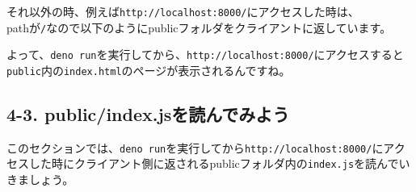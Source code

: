 \begin{Shaded}
\begin{Highlighting}[]
  \OperatorTok{=}  \NormalTok{)}\OperatorTok{;}
   \OperatorTok{===}  \OperatorTok{\&\&}\OperatorTok{===} \NormalTok{) \{}
      \NormalTok{(}\NormalTok{)}\OperatorTok{;}
\NormalTok{  \}}
\end{Highlighting}
\end{Shaded}

それ以外の時、例えば\texttt{http://localhost:8000/}にアクセスした時は、\\
pathが\texttt{/}なので以下のようにpublicフォルダをクライアントに返しています。

\begin{Shaded}
\begin{Highlighting}[]
   \OperatorTok{,}\NormalTok{ \{}
    \OperatorTok{:} \OperatorTok{,}
    \OperatorTok{:} \OperatorTok{,}
    \OperatorTok{:} \OperatorTok{,}
    \OperatorTok{:} \OperatorTok{,}
\NormalTok{  \})}\OperatorTok{;}
\end{Highlighting}
\end{Shaded}

よって、\texttt{deno\ run}を実行してから、\texttt{http://localhost:8000/}にアクセスすると\texttt{public}内の\texttt{index.html}のページが表示されるんですね。

\subsection{4-3.
public/index.jsを読んでみよう}\label{publicindex.jsux3092ux8aadux3093ux3067ux307fux3088ux3046}

このセクションでは、\texttt{deno\ run}を実行してから\texttt{http://localhost:8000/}にアクセスした時にクライアント側に返されるpublicフォルダ内の\texttt{index.js}を読んでいきましょう。

